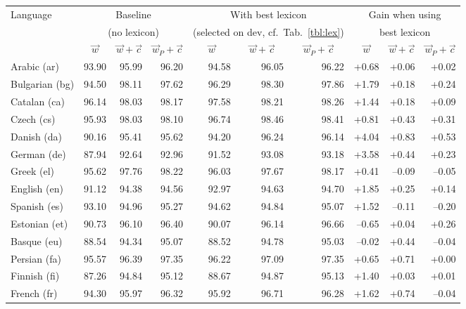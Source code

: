 \documentclass[11pt,letterpaper]{article}
\begin{document}
\begin{table}[t]
\centering\scriptsize
\begin{tabular}{l|rrr|rrr|rrr}
\toprule
Language & \multicolumn{3}{c}{Baseline} & \multicolumn{3}{c}{With best lexicon} & \multicolumn{3}{c}{Gain when using} \\
 & \multicolumn{3}{c}{(no lexicon)} & \multicolumn{3}{c}{(selected on dev, cf.~Tab.~\ref{tbl:lex})} & \multicolumn{3}{c}{best lexicon} \\
 & \multicolumn{1}{c}{$\vec{w}$} & \multicolumn{1}{c}{$\vec{w}+\vec{c}$} & \multicolumn{1}{c}{$\vec{w}_P+\vec{c}$} & \multicolumn{1}{c}{$\vec{w}$} & \multicolumn{1}{c}{$\vec{w}+\vec{c}$} & \multicolumn{1}{c}{$\vec{w}_P+\vec{c}$} & \multicolumn{1}{c}{$\vec{w}$} & \multicolumn{1}{c}{$\vec{w}+\vec{c}$} & \multicolumn{1}{c}{$\vec{w}_P+\vec{c}$} \\
\midrule
Arabic (ar) & 93.90 & 95.99 & 96.20 & 94.58 & 96.05 & 96.22 & +0.68 & +0.06 & +0.02\\
Bulgarian (bg) & 94.50 & 98.11 & 97.62 & 96.29 & 98.30 & 97.86 & +1.79 & +0.18 & +0.24\\
Catalan (ca) & 96.14 & 98.03 & 98.17 & 97.58 & 98.21 & 98.26 & +1.44 & +0.18 & +0.09\\
Czech (cs) & 95.93 & 98.03 & 98.10 & 96.74 & 98.46 & 98.41 & +0.81 & +0.43 & +0.31\\
Danish (da) & 90.16 & 95.41 & 95.62 & 94.20 & 96.24 & 96.14 & +4.04 & +0.83 & +0.53\\
German (de) & 87.94 & 92.64 & 92.96 & 91.52 & 93.08 & 93.18 & +3.58 & +0.44 & +0.23\\
Greek (el) & 95.62 & 97.76 & 98.22 & 96.03 & 97.67 & 98.17 & +0.41 & --0.09 & --0.05\\
English (en) & 91.12 & 94.38 & 94.56 & 92.97 & 94.63 & 94.70 & +1.85 & +0.25 & +0.14\\
Spanish (es) & 93.10 & 94.96 & 95.27 & 94.62 & 94.84 & 95.07 & +1.52 & --0.11 & --0.20\\
Estonian (et) & 90.73 & 96.10 & 96.40 & 90.07 & 96.14 & 96.66 & --0.65 & +0.04 & +0.26\\
Basque (eu) & 88.54 & 94.34 & 95.07 & 88.52 & 94.78 & 95.03 & --0.02 & +0.44 & --0.04\\
Persian (fa) & 95.57 & 96.39 & 97.35 & 96.22 & 97.09 & 97.35 & +0.65 & +0.71 & +0.00\\
Finnish (fi) & 87.26 & 94.84 & 95.12 & 88.67 & 94.87 & 95.13 & +1.40 & +0.03 & +0.01\\
French (fr) & 94.30 & 95.97 & 96.32 & 95.92 & 96.71 & 96.28 & +1.62 & +0.74 & --0.04\\

\end{tabular}
\end{table}
\end{document}
